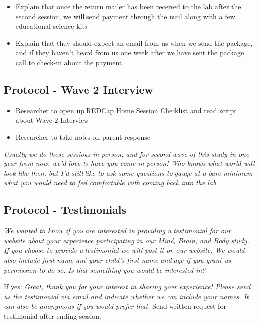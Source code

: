 \documentclass[]{book}
\providecommand{\tightlist}{%
  \setlength{\itemsep}{0pt}\setlength{\parskip}{0pt}}
\begin{document}
\begin{itemize}
\tightlist
\item
  Explain that once the return mailer has been received to the lab after the second session, we will send payment through the mail along with a few educational science kits
\item
  Explain that they should expect an email from us when we send the package, and if they haven't heard from us one week after we have sent the package, call to check-in about the payment
\end{itemize}

\hypertarget{protocol---wave-2-interview}{%
\subsection{Protocol - Wave 2 Interview}\label{protocol---wave-2-interview}}

\begin{itemize}
\tightlist
\item
  Researcher to open up REDCap Home Session Checklist and read script about Wave 2 Interview
\item
  Researcher to take notes on parent response
\end{itemize}

\emph{Usually we do these sessions in person, and for second wave of this study in one year from now, we'd love to have you come in person! Who knows what world will look like then, but I'd still like to ask some questions to gauge at a bare minimum what you would need to feel comfortable with coming back into the lab.}

\hypertarget{protocol---testimonials}{%
\subsection{Protocol - Testimonials}\label{protocol---testimonials}}

\emph{We wanted to know if you are interested in providing a testimonial for our website about your experience participating in our Mind, Brain, and Body study. If you choose to provide a testimonial we will post it on our website. We would also include first name and your child's first name and age if you grant us permission to do so. Is that something you would be interested in?}

If yes: \emph{Great, thank you for your interest in sharing your experience! Please send us the testimonial via email and indicate whether we can include your names. It can also be anonymous if you would prefer that.} Send written request for testimonial after ending session.
\end{document}
